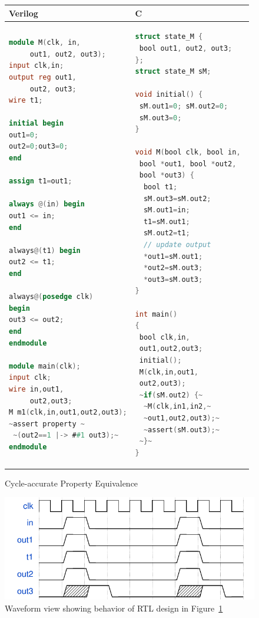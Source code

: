 %
\begin{figure}[htbp]
\scriptsize
\begin{tabular}{l|l}
\hline
Verilog & C \\
\hline
\begin{lstlisting}[mathescape=true,language=Verilog,style=base]
module M(clk, in, 
     out1, out2, out3);
input clk,in;
output reg out1, 
     out2, out3;
wire t1;

initial begin
out1=0; 
out2=0;out3=0;
end

assign t1=out1;

always @(in) begin
out1 <= in;
end

always@(t1) begin
out2 <= t1;
end

always@(posedge clk) 
begin
out3 <= out2;
end
endmodule

module main(clk);
input clk;
wire in,out1,
     out2,out3;
M m1(clk,in,out1,out2,out3);
~assert property ~
 ~(out2==1 |-> ##1 out3);~
endmodule
\end{lstlisting}
&
\begin{lstlisting}[mathescape=true,language=C,style=base]
struct state_M {
 bool out1, out2, out3; 
};
struct state_M sM;

void initial() {
 sM.out1=0; sM.out2=0; 
 sM.out3=0;
}

void M(bool clk, bool in, 
 bool *out1, bool *out2, 
 bool *out3) {
  bool t1;
  sM.out3=sM.out2;
  sM.out1=in;
  t1=sM.out1;
  sM.out2=t1;
  // update output  
  *out1=sM.out1;
  *out2=sM.out3;
  *out3=sM.out3;
}
 
int main()
{
 bool clk,in,
 out1,out2,out3;
 initial();
 M(clk,in,out1,
 out2,out3);
 ~if(sM.out2) {~
  ~M(clk,in1,in2,~
  ~out1,out2,out3);~
  ~assert(sM.out3);~
 ~}~
}
\end{lstlisting}
\\
\hline
\end{tabular}
\caption{Cycle-accurate Property Equivalence}
\label{figure:prop1}
\end{figure}
%
\begin{figure}[t]
\begin{center}
  \includegraphics[width=\columnwidth]{figures/wavedrom.pdf}%
  \caption{Waveform view showing behavior of RTL design in
  Figure~\ref{figure:prop1}} 
\label{fig:waveform}
\end{center}
\end{figure}


